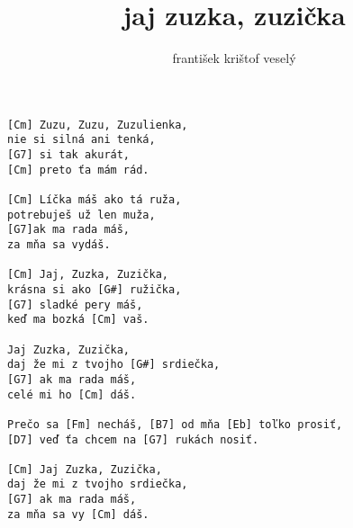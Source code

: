\author{františek krištof veselý}
\title{jaj zuzka, zuzička}
\maketitle
\begin{verbatim}
[Cm] Zuzu, Zuzu, Zuzulienka, 
nie si silná ani tenká, 
[G7] si tak akurát, 
[Cm] preto ťa mám rád. 

[Cm] Líčka máš ako tá ruža, 
potrebuješ už len muža, 
[G7]ak ma rada máš, 
za mňa sa vydáš. 

[Cm] Jaj, Zuzka, Zuzička, 
krásna si ako [G#] ružička, 
[G7] sladké pery máš, 
keď ma bozká [Cm] vaš. 

Jaj Zuzka, Zuzička, 
daj že mi z tvojho [G#] srdiečka, 
[G7] ak ma rada máš, 
celé mi ho [Cm] dáš. 

Prečo sa [Fm] necháš, [B7] od mňa [Eb] toľko prosiť, 
[D7] veď ťa chcem na [G7] rukách nosiť. 

[Cm] Jaj Zuzka, Zuzička, 
daj že mi z tvojho srdiečka, 
[G7] ak ma rada máš, 
za mňa sa vy [Cm] dáš. 
\end{verbatim}